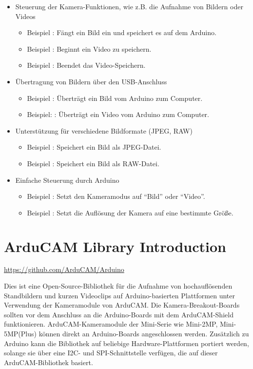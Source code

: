 \begin{itemize}
  \item Steuerung der Kamera-Funktionen, wie z.B. die Aufnahme von Bildern oder Videos
    \begin{itemize}
       \item   Beispiel : Fängt ein Bild ein und speichert es auf dem Arduino.
       \item   Beispiel : Beginnt ein Video zu speichern.
       \item Beispiel : Beendet das Video-Speichern.
     \end{itemize}
  \item Übertragung von Bildern über den USB-Anschluss
    \begin{itemize}
      \item  Beispiel : Überträgt ein Bild vom Arduino zum Computer.
      \item   Beispiel: : Überträgt ein Video vom Arduino zum Computer.
    \end{itemize}
  \item Unterstützung für verschiedene Bildformate (JPEG, RAW)
    \begin{itemize}
      \item Beispiel : Speichert ein Bild als JPEG-Datei.
      \item Beispiel : Speichert ein Bild als RAW-Datei.
    \end{itemize}
  \item Einfache Steuerung durch Arduino
    \begin{itemize}
      \item Beispiel : Setzt den Kameramodus auf ``Bild'' oder ``Video''.
      \item Beispiel : Setzt die Auflösung der Kamera auf eine bestimmte Größe.
    \end{itemize}
\end{itemize}

\section{ArduCAM Library Introduction}

\url{https://github.com/ArduCAM/Arduino}


Dies ist eine Open-Source-Bibliothek für die Aufnahme von hochauflösenden Standbildern und kurzen Videoclips auf Arduino-basierten Plattformen unter Verwendung der Kameramodule von ArduCAM.
Die Kamera-Breakout-Boards sollten vor dem Anschluss an die Arduino-Boards mit dem ArduCAM-Shield funktionieren.
ArduCAM-Kameramodule der Mini-Serie wie Mini-2MP, Mini-5MP(Plus) können direkt an Arduino-Boards angeschlossen werden.
Zusätzlich zu Arduino kann die Bibliothek auf beliebige Hardware-Plattformen portiert werden, solange sie über eine I2C- und SPI-Schnittstelle verfügen, die auf dieser ArduCAM-Bibliothek basiert.


